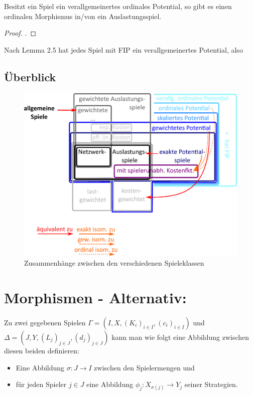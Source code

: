 \begin{beob}
	Besitzt ein Spiel ein verallgemeinertes ordinales Potential, so gibt es einen ordinalen Morphismus in/von  ein Auslastungsspiel.
\end{beob}

\begin{proof}
	.
\end{proof}

\begin{beob}
	Nach \cite{MonShap} Lemma 2.5 hat jedes Spiel mit FIP ein verallgemeinertes Potential, also 
\end{beob}


\subsection{Überblick}

\begin{figure}[h]\centering
	\includegraphics[width=.7\textwidth]{../Bilder/VennDiagramm.pdf}
	\caption{Zusammenhänge zwischen den verschiedenen Spieleklassen}
\end{figure}


\section{Morphismen - Alternativ:}

Zu zwei gegebenen Spielen $\Gamma = (I, X, (K_i)_{i\in I}, (c_i)_{i\in I})$ und $\Delta = (J, Y, (L_j)_{j\in J}, (d_j)_{j\in J})$ kann man wie folgt eine Abbildung zwischen diesen beiden definieren:
\begin{itemize}
	\item Eine Abbildung $\sigma: J \to I$ zwischen den Spielermengen und
	\item für jeden Spieler $j \in J$ eine Abbildung $\phi_j: X_{\sigma(j)} \to Y_j$ seiner Strategien.
\end{itemize}

